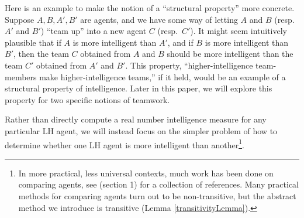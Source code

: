 \documentclass[twoside,11pt]{article}
\begin{document}
Here is an example to make the notion of a ``structural property'' more
concrete. Suppose $A,B,A',B'$ are agents, and we have some way of letting
$A$ and $B$ (resp.~$A'$ and $B'$) ``team up'' into a new agent $C$ (resp.~$C'$).
It might seem intuitively plausible that if $A$ is more
intelligent than $A'$, and if $B$ is more intelligent than $B'$, then the team
$C$ obtained from $A$ and $B$ should be more intelligent than the team $C'$
obtained from $A'$ and $B'$. This property, ``higher-intelligence team-members
make higher-intelligence teams,'' if it held, would be an example of a structural property
of intelligence. Later in this paper, we will explore this property for
two specific notions of teamwork.

Rather than directly compute a real number intelligence measure for any
particular LH agent, we will instead focus on the simpler problem of
how to determine whether one LH agent is more intelligent
than another\footnote{In more practical, less universal contexts, much work has
been done on comparing agents, see \cite{balduzzi} (section 1) for a collection
of references. Many practical methods for comparing agents turn out to be non-transitive,
but the abstract method we introduce is transitive (Lemma \ref{transitivityLemma}).}.
\end{document}
